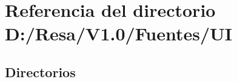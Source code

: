 \section{Referencia del directorio D\+:/\+Resa/\+V1.0/\+Fuentes/\+UI}
\label{dir_bc0982eccc3d5349b1d6132cf56a9fc8}
\subsection*{Directorios}
\begin{DoxyCompactItemize}
\end{DoxyCompactItemize}
